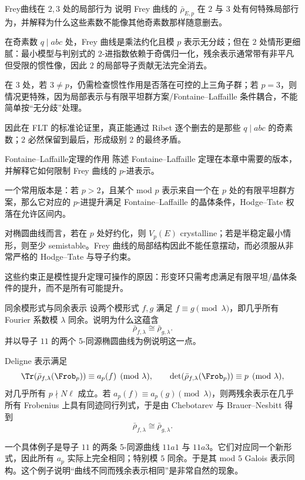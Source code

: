 \begin{problem}{Frey曲线在 $2,3$ 处的局部行为}
说明 Frey 曲线的 $\bar\rho_{E,p}$ 在 $2$ 与 $3$ 处有何特殊局部行为，并解释为什么这些素数不能像其他奇素数那样随意删去。
\end{problem}
\begin{solution}
在奇素数 $q\mid abc$ 处，Frey 曲线是乘法约化且模 $p$ 表示无分歧；但在 $2$ 处情形更细腻：最小模型与判别式的 $2$-进指数依赖于奇偶归一化，残余表示通常带有非平凡但受限的惯性像，因此 $2$ 的局部导子贡献无法完全消去。

在 $3$ 处，若 $3\neq p$，仍需检查惯性作用是否落在可控的上三角子群；若 $p=3$，则情况更特殊，因为局部表示与有限平坦群方案/Fontaine--Laffaille 条件耦合，不能简单按“无分歧”处理。

因此在 FLT 的标准论证里，真正能通过 Ribet 逐个删去的是那些 $q\mid abc$ 的奇素数；$2$ 必然保留到最后，形成级别 $2$ 的最终矛盾。
\end{solution}

\begin{problem}{Fontaine--Laffaille定理的作用}
陈述 Fontaine--Laffaille 定理在本章中需要的版本，并解释它如何限制 Frey 曲线的 $p$-进表示。
\end{problem}
\begin{solution}
一个常用版本是：若 $p>2$，且某个 mod $p$ 表示来自一个在 $p$ 处的有限平坦群方案，那么它对应的 $p$-进提升满足 Fontaine--Laffaille 的晶体条件，Hodge--Tate 权落在允许区间内。

对椭圆曲线而言，若在 $p$ 处好约化，则 $V_p(E)$ crystalline；若是半稳定最小情形，则至少 semistable。Frey 曲线的局部结构因此不能任意摆动，而必须服从非常严格的 Hodge--Tate 与导子约束。

这些约束正是模性提升定理可操作的原因：形变环只需考虑满足有限平坦/晶体条件的提升，而不是所有可能提升。
\end{solution}

\begin{problem}{同余模形式与同余表示}
设两个模形式 $f,g$ 满足 $f\equiv g\pmod\lambda$，即几乎所有 Fourier 系数模 $\lambda$ 同余。说明为什么这蕴含
\[
\bar\rho_{f,\lambda}\cong \bar\rho_{g,\lambda}.
\]
并以导子 $11$ 的两个 5-同源椭圆曲线为例说明这一点。
\end{problem}
\begin{solution}
Deligne 表示满足
\[
\Tr(\bar\rho_{f,\lambda}(\Frob_p))\equiv a_p(f)\pmod\lambda,
\qquad
\det(\bar\rho_{f,\lambda}(\Frob_p))\equiv p\pmod\lambda,
\]
对几乎所有 $p\nmid N\ell$ 成立。若 $a_p(f)\equiv a_p(g)\pmod\lambda$，则两残余表示在几乎所有 Frobenius 上具有同迹同行列式，于是由 Chebotarev 与 Brauer--Nesbitt 得到
\[
\bar\rho_{f,\lambda}\cong \bar\rho_{g,\lambda}.
\]

一个具体例子是导子 $11$ 的两条 5-同源曲线 $11a1$ 与 $11a3$。它们对应同一个新形式，因此所有 $a_p$ 实际上完全相同；特别模 $5$ 同余。于是其 mod $5$ Galois 表示同构。这个例子说明“曲线不同而残余表示相同”是非常自然的现象。
\end{solution}

